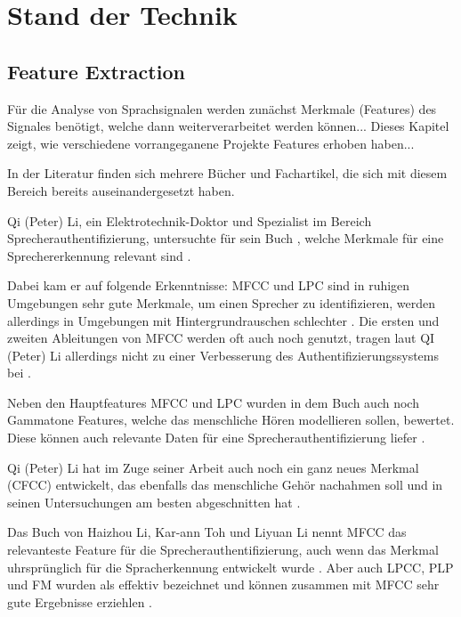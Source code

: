 \section{Stand der Technik}

\subsection{Feature Extraction}

Für die Analyse von Sprachsignalen werden zunächst Merkmale (Features) des Signales benötigt, welche dann weiterverarbeitet werden können...
Dieses Kapitel zeigt, wie verschiedene vorrangeganene Projekte Features erhoben haben...

In der Literatur finden sich mehrere Bücher und Fachartikel, die sich mit diesem Bereich bereits auseinandergesetzt haben. 

Qi (Peter) Li, ein Elektrotechnik-Doktor und Spezialist im Bereich Sprecherauthentifizierung, untersuchte für sein Buch , welche Merkmale für eine Sprechererkennung relevant sind \autocite{li_speaker_2012}.

Dabei kam er auf folgende Erkenntnisse:
MFCC und LPC sind in ruhigen Umgebungen sehr gute Merkmale, um einen Sprecher zu identifizieren, werden allerdings in Umgebungen mit Hintergrundrauschen schlechter \autocite[vgl.][S. 136]{li_speaker_2012}.
Die ersten und zweiten Ableitungen von MFCC werden oft auch noch genutzt, tragen laut QI (Peter) Li allerdings nicht zu einer Verbesserung des Authentifizierungssystems bei \autocite[vgl.][S. 143]{li_speaker_2012}.

Neben den Hauptfeatures MFCC und LPC wurden in dem Buch auch noch Gammatone Features, welche das menschliche Hören modellieren sollen, bewertet.
Diese können auch relevante Daten für eine Sprecherauthentifizierung liefer \autocite[vgl.][S. 111, 117]{li_speaker_2012}.

Qi (Peter) Li hat im Zuge seiner Arbeit auch noch ein ganz neues Merkmal (CFCC) entwickelt, das ebenfalls das menschliche Gehör nachahmen soll und in seinen Untersuchungen am besten abgeschnitten hat \autocite[vgl.][S. 135]{li_speaker_2012}.

Das Buch  von Haizhou Li, Kar-ann Toh und Liyuan Li nennt MFCC das relevanteste Feature für die Sprecherauthentifizierung, auch wenn das Merkmal uhrsprünglich für die Spracherkennung entwickelt wurde \autocite[vgl.][S. 7, 51]{li_advanced_nodate}.
Aber auch LPCC, PLP und FM wurden als effektiv bezeichnet und können zusammen mit MFCC sehr gute Ergebnisse erziehlen \autocite[vgl.][S. 6, 67]{li_advanced_nodate}.

